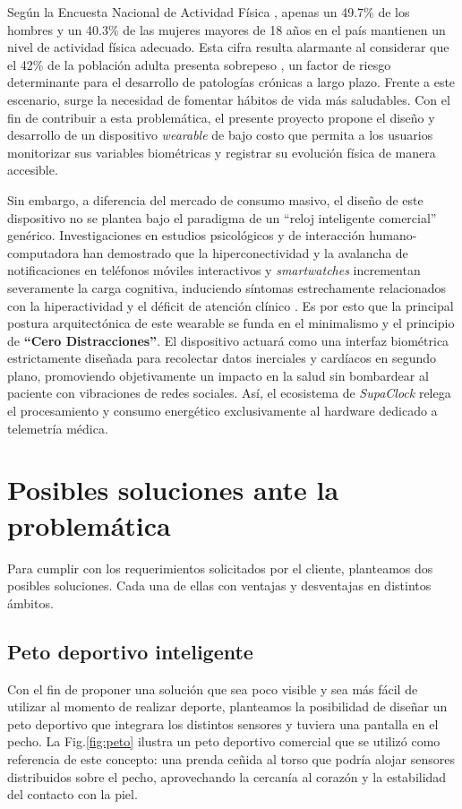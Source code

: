 \documentclass[letterpaper,11pt]{article}
\newcommand{\rfigura}[1]{Fig.\ref{#1}}
\begin{document}

Según la Encuesta Nacional de Actividad Física \citep{encuesta_af}, apenas un 49.7\% de los hombres y un 40.3\% de las mujeres mayores de 18 años en el país mantienen un nivel de actividad física adecuado. Esta cifra resulta alarmante al considerar que el 42\% de la población adulta presenta sobrepeso \citep{obesidad_chile}, un factor de riesgo determinante para el desarrollo de patologías crónicas a largo plazo. Frente a este escenario, surge la necesidad de fomentar hábitos de vida más saludables. Con el fin de contribuir a esta problemática, el presente proyecto propone el diseño y desarrollo de un dispositivo \textit{wearable} de bajo costo que permita a los usuarios monitorizar sus variables biométricas y registrar su evolución física de manera accesible.

Sin embargo, a diferencia del mercado de consumo masivo, el diseño de este dispositivo no se plantea bajo el paradigma de un ``reloj inteligente comercial'' genérico. Investigaciones en estudios psicológicos y de interacción humano-computadora han demostrado que la hiperconectividad y la avalancha de notificaciones en teléfonos móviles interactivos y \textit{smartwatches} incrementan severamente la carga cognitiva, induciendo síntomas estrechamente relacionados con la hiperactividad y el déficit de atención clínico \citep{Kushlev2016, Pielot2014}. Es por esto que la principal postura arquitectónica de este wearable se funda en el minimalismo y el principio de \textbf{``Cero Distracciones''}. El dispositivo actuará como una interfaz biométrica estrictamente diseñada para recolectar datos inerciales y cardíacos en segundo plano, promoviendo objetivamente un impacto en la salud \citep{Shin2019} sin bombardear al paciente con vibraciones de redes sociales. Así, el ecosistema de \textit{SupaClock} relega el procesamiento y consumo energético exclusivamente al hardware dedicado a telemetría médica.

\section{Posibles soluciones ante la problemática}
Para cumplir con los requerimientos solicitados por el cliente, planteamos dos posibles soluciones. Cada una de ellas con ventajas y desventajas en distintos ámbitos.

\subsection{Peto deportivo inteligente}
Con el fin de proponer una solución que sea poco visible y sea más fácil de utilizar al momento de realizar deporte, planteamos la posibilidad de diseñar un peto deportivo que integrara los distintos sensores y tuviera una pantalla en el pecho. La \rfigura{fig:peto} ilustra un peto deportivo comercial que se utilizó como referencia de este concepto: una prenda ceñida al torso que podría alojar sensores distribuidos sobre el pecho, aprovechando la cercanía al corazón y la estabilidad del contacto con la piel.
\end{document}
